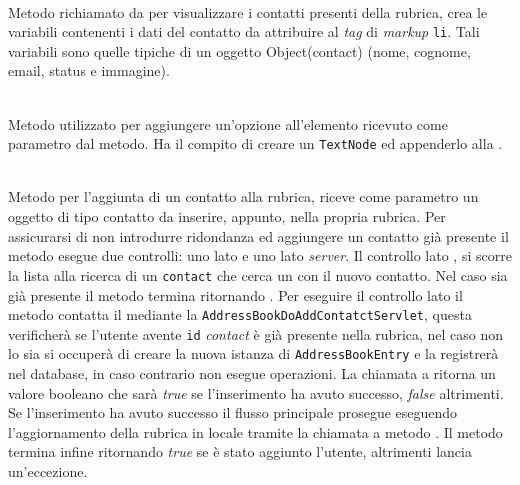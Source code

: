 \begin{description}
	\item{}\\

Metodo richiamato da  per visualizzare i contatti presenti della rubrica, crea le variabili contenenti i dati del contatto da attribuire al \textit{tag} di \textit{markup} \texttt{li}. Tali variabili sono quelle tipiche di un oggetto Object(contact) (nome, cognome, email, status e immagine).


\item{}\\
Metodo utilizzato per aggiungere un'opzione all'elemento  ricevuto come parametro dal metodo. Ha il compito di creare un \texttt{TextNode} ed appenderlo alla .

	
	\item{}\\
	Metodo per l'aggiunta di un contatto alla rubrica, riceve come parametro un oggetto di tipo contatto da inserire, appunto, nella propria rubrica. 
Per assicurarsi di non introdurre ridondanza ed aggiungere un contatto già presente il metodo esegue due controlli: uno lato  e uno lato \textit{server}. 
Il controllo lato , si scorre la lista  alla ricerca di un \texttt{contact} che cerca un  con il nuovo contatto. Nel caso sia già presente il metodo termina ritornando . Per eseguire il controllo lato  il metodo contatta il  mediante la  \texttt{AddressBookDoAddContatctServlet}, questa verificherà se l'utente avente \texttt{id} \textit{contact} è già presente nella rubrica, nel caso non lo sia si occuperà di creare la nuova istanza di \texttt{AddressBookEntry} e la registrerà nel database, in caso contrario non esegue operazioni. 
La chiamata a  ritorna un valore booleano che sarà \textit{true} se l'inserimento ha avuto successo, \textit{false} altrimenti. 
Se l'inserimento ha avuto successo il flusso principale prosegue eseguendo l'aggiornamento della rubrica in locale tramite la chiamata a metodo . Il metodo termina infine ritornando \textit{true} se è stato aggiunto l'utente, altrimenti lancia un'eccezione.


\end{description}
